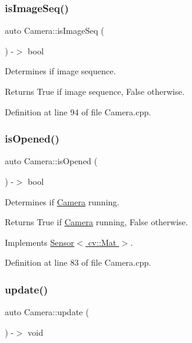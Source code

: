 \subsubsection{\texorpdfstring{is\+Image\+Seq()}{isImageSeq()}}
{\footnotesize\ttfamily auto Camera\+::is\+Image\+Seq (\begin{DoxyParamCaption}{ }\end{DoxyParamCaption}) -\/$>$ bool}



Determines if image sequence. 

\begin{DoxyReturn}{Returns}
True if image sequence, False otherwise. 
\end{DoxyReturn}


Definition at line 94 of file Camera.\+cpp.

\mbox{\label{class_camera_a635f36e95291ad8962a6b85bf2a12def}} 
\subsubsection{\texorpdfstring{is\+Opened()}{isOpened()}}
{\footnotesize\ttfamily auto Camera\+::is\+Opened (\begin{DoxyParamCaption}{ }\end{DoxyParamCaption}) -\/$>$ bool\hspace{0.3cm}{\ttfamily [virtual]}}



Determines if \hyperlink{class_camera}{Camera} running. 

\begin{DoxyReturn}{Returns}
True if \hyperlink{class_camera}{Camera} running, False otherwise. 
\end{DoxyReturn}


Implements \hyperlink{class_sensor_a78f10e5c1fd3c7e5fcbbf4ca735ac1e7}{Sensor$<$ cv\+::\+Mat $>$}.



Definition at line 83 of file Camera.\+cpp.

\mbox{\label{class_camera_ae957cc994193c4a367d1e592a16a477f}} 
\subsubsection{\texorpdfstring{update()}{update()}}
{\footnotesize\ttfamily auto Camera\+::update (\begin{DoxyParamCaption}{ }\end{DoxyParamCaption}) -\/$>$ void\hspace{0.3cm}{\ttfamily [virtual]}}



